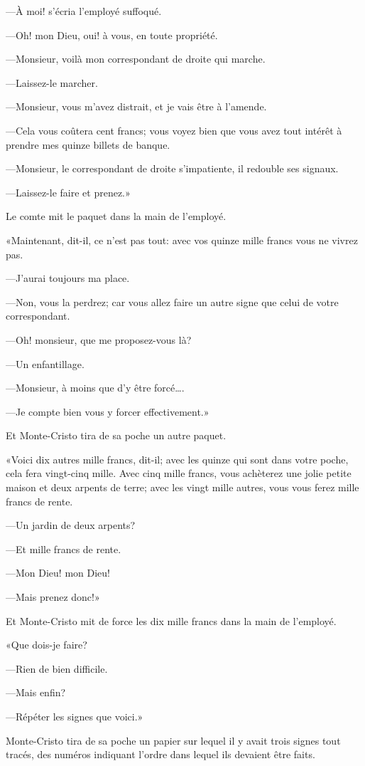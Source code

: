 —À moi! s'écria l'employé suffoqué. 

—Oh! mon Dieu, oui! à vous, en toute propriété. 

—Monsieur, voilà mon correspondant de droite qui marche. 

—Laissez-le marcher. 

—Monsieur, vous m'avez distrait, et je vais être à l'amende. 

—Cela vous coûtera cent francs; vous voyez bien que vous avez tout intérêt à prendre mes quinze billets de banque. 

—Monsieur, le correspondant de droite s'impatiente, il redouble ses signaux. 

—Laissez-le faire et prenez.» 

Le comte mit le paquet dans la main de l'employé. 

«Maintenant, dit-il, ce n'est pas tout: avec vos quinze mille francs vous ne vivrez pas. 

—J'aurai toujours ma place.  

—Non, vous la perdrez; car vous allez faire un autre signe que celui de votre correspondant. 

—Oh! monsieur, que me proposez-vous là? 

—Un enfantillage. 

—Monsieur, à moins que d'y être forcé\dots. 

—Je compte bien vous y forcer effectivement.» 

Et Monte-Cristo tira de sa poche un autre paquet. 

«Voici dix autres mille francs, dit-il; avec les quinze qui sont dans votre poche, cela fera vingt-cinq mille. Avec cinq mille francs, vous achèterez une jolie petite maison et deux arpents de terre; avec les vingt mille autres, vous vous ferez mille francs de rente. 

—Un jardin de deux arpents? 

—Et mille francs de rente. 

—Mon Dieu! mon Dieu! 

—Mais prenez donc!» 

Et Monte-Cristo mit de force les dix mille francs dans la main de l'employé. 

«Que dois-je faire?  

—Rien de bien difficile. 

—Mais enfin? 

—Répéter les signes que voici.» 

Monte-Cristo tira de sa poche un papier sur lequel il y avait trois signes tout tracés, des numéros indiquant l'ordre dans lequel ils devaient être faits. 

